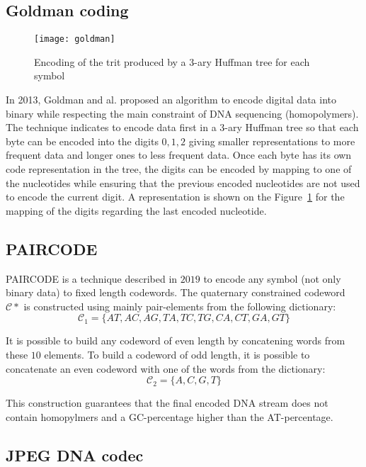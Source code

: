 
\subsection{Goldman coding}
\begin{figure}
    \centering
    \texttt{[image: goldman]}
    \caption{Encoding of the trit produced by a 3-ary Huffman tree for each symbol}
    \label{fig:goldman}
\end{figure}

In 2013, Goldman and al. \cite{bib:goldman} proposed an algorithm to encode digital data into binary while respecting the main constraint of DNA sequencing (homopolymers). 
The technique indicates to encode data first in a 3-ary Huffman tree so that each byte can be encoded into the digits $0,1,2$ giving smaller representations to more frequent data and longer ones to less frequent data. 
Once each byte has its own code representation in the tree, the digits can be encoded by mapping to one of the nucleotides while ensuring that the previous encoded nucleotides are not used to encode the current digit. A representation is shown on the Figure~\ref{fig:goldman} for the mapping of the digits regarding the last encoded nucleotide.

\subsection{PAIRCODE}

PAIRCODE \cite{bib:paircode} is a technique described \cite{bib:paircode} in $2019$ to encode any symbol (not only binary data) to fixed length codewords.
The quaternary constrained codeword $\mathcal{C}*$ is constructed using mainly pair-elements from the following dictionary:
$$
\mathcal{C}_1=\{AT,AC,AG,TA,TC,TG,CA,CT,GA,GT\}
$$

It is possible to build any codeword of even length by concatening words from these $10$ elements. To build a codeword of odd length, it is possible to concatenate an even codeword with one of the words from the dictionary:
$$
\mathcal{C}_2=\{A,C,G,T\}
$$

This construction guarantees that the final encoded DNA stream does not contain homopylmers and a GC-percentage higher than the AT-percentage.

\subsection{JPEG DNA codec}
\label{subsec:jpegdna}

